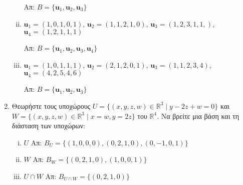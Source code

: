 \begin{enumerate}
\begin{enumerate}[(i)]
                \hfill Απ: $ B = \{ \mathbf{u}_{1}, \mathbf{u}_{2}, \mathbf{u}_{3} \} $ 

            \item $ \mathbf{u}_{1} = (1,0,1,0,1) $, $ \mathbf{u}_{2} = (1,1,2,1,0) $, $ \mathbf{u}
                _{3} = (1,2,3,1,1,) $, $ \mathbf{u}_{4} = (1,2,1,1,1) $

                \hfill Απ: $ B = \{ \mathbf{u}_{1}, \mathbf{u}_{2}, \mathbf{u}_{3}, \mathbf{u}_{4} \} $ 
            \item $ \mathbf{u}_{1} = (1,0,1,1,1) $, $ \mathbf{u}_{2} = (2,1,2,0,1) $, $ \mathbf{u}
                _{3} = (1,1,2,3,4) $, $ \mathbf{u}_{4} = (4,2,5,4,6) $

                \hfill Απ: $ B = \{ \mathbf{u}_{1}, \mathbf{u}_{2}, \mathbf{u}_{3} \} $ 
        \end{enumerate}

    \item Θεωρήστε τους υποχώρους $ U = \{ (x,y,z,w) \in \mathbb{R}^{3} \mid y - 2z + w = 0 \} $ και
        $ W = \{ (x,y,z,w) \in \mathbb{R}^{3} \mid x = w, y = 2z \} $ του $\mathbb{R}^{4}$. Να
        βρείτε μια βάση και τη διάσταση των υποχώρων:
        \begin{enumerate}[(i)]
            \item $ U $ \hfill Απ: $ B_{U} = \{ (1,0,0,0), (0,2,1,0), (0,-1,0,1) \} $ 
            \item $ W $ \hfill Απ: $ B_{W} = \{ (0,2,1,0), (1,0,0,1) \} $ 
            \item $ U \cap W $ \hfill Απ: $ B_{U\cap W} = \{ (0,2,1,0) \} $ 
        \end{enumerate}	



\end{enumerate}
